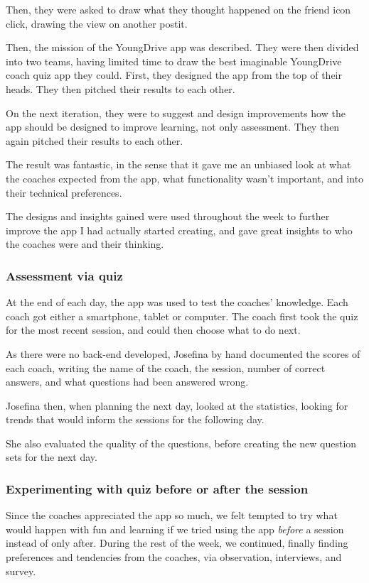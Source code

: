 Then, they were asked to draw what they thought happened on the friend icon click, drawing the view on another postit.

Then, the mission of the YoungDrive app was described. They were then divided into two teams, having limited time to draw the best imaginable YoungDrive coach quiz app they could. First, they designed the app from the top of their heads. They then pitched their results to each other.

On the next iteration, they were to suggest and design improvements how the app should be designed to improve learning, not only assessment. They then again pitched their results to each other.

The result was fantastic, in the sense that it gave me an unbiased look at what the coaches expected from the app, what functionality wasn't important, and into their technical preferences.

The designs and insights gained were used throughout the week to further improve the app I had actually started creating, and gave great insights to who the coaches were and their thinking.

\subsubsection{Assessment via quiz}
At the end of each day, the app was used to test the coaches' knowledge. Each coach got either a smartphone, tablet or computer. The coach first took the quiz for the most recent session, and could then choose what to do next.

As there were no back-end developed, Josefina by hand documented the scores of each coach, writing the name of the coach, the session, number of correct answers, and what questions had been answered wrong.

Josefina then, when planning the next day, looked at the statistics, looking for trends that would inform the sessions for the following day.

She also evaluated the quality of the questions, before creating the new question sets for the next day.

\subsubsection{Experimenting with quiz before or after the session}
Since the coaches appreciated the app so much, we felt tempted to try what would happen with fun and learning if we tried using the app \textit{before} a session instead of only after. During the rest of the week, we continued, finally finding preferences and tendencies from the coaches, via observation, interviews, and survey.

